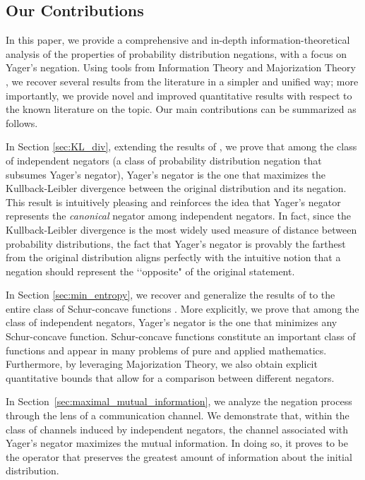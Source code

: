 \documentclass[pdflatex,sn-basic,iicol]{sn-jnl}%
\theoremstyle{thmstyleone}%
\theoremstyle{thmstyletwo}%
\theoremstyle{thmstylethree}%
\begin{document}
\subsection{Our Contributions}
In this paper, we provide a comprehensive and in-depth information-theoretical 
analysis of the properties of probability distribution negations, with a focus on Yager's negation. Using
 tools from Information Theory \citep{mceliece2002theory} and Majorization Theory \citep{marshall1979inequalities},
we recover several results from the literature in a simpler and unified way; more importantly,
we provide novel and improved quantitative results with respect to the known literature on the topic.
Our main contributions can be summarized as follows.

In Section \ref{sec:KL_div}, extending the results of \cite{tinaztepe2023application}, we prove that among the class 
of independent negators \citep{generating} (a class of probability distribution negation that subsumes Yager's negator), 
Yager's negator is the one that maximizes the Kullback-Leibler divergence between the original distribution and its negation. 
This result is intuitively
pleasing and reinforces the idea that Yager's negator represents the \textit{canonical} negator among independent negators. 
In fact, since the Kullback-Leibler divergence is the most widely used measure of distance between probability distributions, the fact that Yager’s negator is provably the farthest from the original distribution aligns perfectly with the intuitive notion that a negation should represent the \lq\lq opposite" of the original statement.

In Section \ref{sec:min_entropy}, we recover and generalize the results of \cite{klein2022some} to the entire class of Schur-concave functions \citep{marshall1979inequalities}. More explicitly,
we prove that among the class of independent negators, Yager's negator is the one that minimizes any Schur-concave function. Schur-concave functions constitute an important class of functions
and appear in many problems of pure and applied mathematics.
Furthermore, by leveraging Majorization Theory, we also obtain explicit quantitative bounds that allow for a comparison between different negators.

In Section~\ref{sec:maximal_mutual_information}, we analyze the negation process through the lens of a communication channel. We demonstrate that, within the class of  channels induced by independent negators, the channel associated with Yager's negator maximizes the mutual information. In doing so, it proves to be the operator that preserves the greatest amount of information about the initial distribution.
\end{document}
